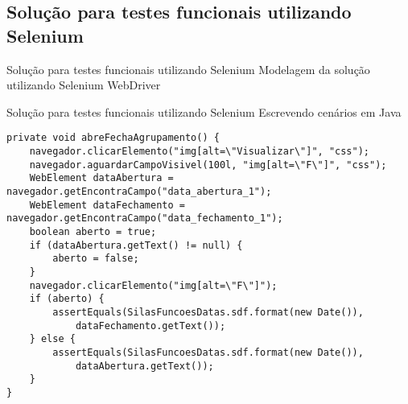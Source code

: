 \documentclass{beamer}
\begin{document}
\subsection{Solução para testes funcionais utilizando Selenium}
\begin{frame}{Solução para testes funcionais utilizando Selenium}
    Modelagem da solução utilizando Selenium WebDriver
	\begin{center}\end{center}
\end{frame}
\begin{frame}[fragile]{Solução para testes funcionais utilizando Selenium}
    Escrevendo cenários em Java
    \begin{lstlisting}
private void abreFechaAgrupamento() {
	navegador.clicarElemento("img[alt=\"Visualizar\"]", "css");
	navegador.aguardarCampoVisivel(100l, "img[alt=\"F\"]", "css");
	WebElement dataAbertura = navegador.getEncontraCampo("data_abertura_1");
	WebElement dataFechamento = navegador.getEncontraCampo("data_fechamento_1");
	boolean aberto = true;
	if (dataAbertura.getText() != null) {
		aberto = false;
	}
	navegador.clicarElemento("img[alt=\"F\"]");
	if (aberto) {
		assertEquals(SilasFuncoesDatas.sdf.format(new Date()),
		    dataFechamento.getText());
	} else {
		assertEquals(SilasFuncoesDatas.sdf.format(new Date()),
		    dataAbertura.getText());
	}
}
    \end{lstlisting}
\end{frame}
\end{document}
